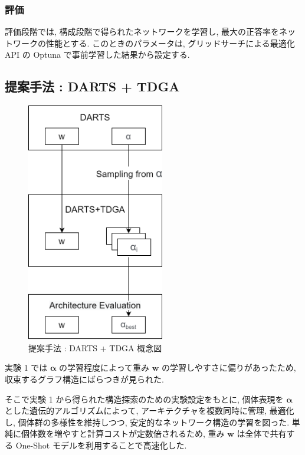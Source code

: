 \subsubsection{評価}
評価段階では, 構成段階で得られたネットワークを学習し,
最大の正答率をネットワークの性能とする.
このときのパラメータは, グリッドサーチによる最適化 API の Optuna \cite{akiba2019optuna}
で事前学習した結果から設定する.




\clearpage\newpage
\changeindent{0cm}
\subsection{提案手法 : DARTS + TDGA}
\label{sec:pred.02}
\changeindent{2cm}

\begin{figure}[t]
  \begin{center}
    \includegraphics[clip,width=6cm]{./fig/03.pred/datdga.png}
  \end{center}
  \caption{提案手法 : DARTS + TDGA 概念図}
  \label{fig:image_ga}
\end{figure}

実験 1 では $\bm{\alpha}$ の学習程度によって重み $\bm{w}$ の学習しやすさに偏りがあったため,
収束するグラフ構造にばらつきが見られた.

そこで実験 1 から得られた構造探索のための実験設定をもとに,
個体表現を $\bm{\alpha}$ とした遺伝的アルゴリズムによって,
アーキテクチャを複数同時に管理, 最適化し,
個体群の多様性を維持しつつ, 安定的なネットワーク構造の学習を図った.
単純に個体数を増やすと計算コストが定数倍されるため,
重み $\bm{w}$ は全体で共有する One-Shot モデルを利用することで高速化した.


